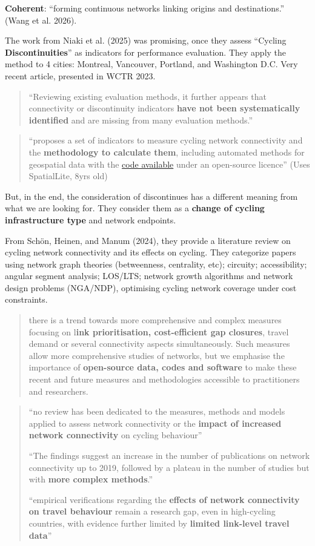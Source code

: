 \documentclass[
  sn-nature,
]{sn-jnl}
\begin{document}
\textbf{Coherent}: ``forming continuous networks linking origins and
destinations.'' (Wang et al. 2026).

The work from Niaki et al. (2025) was promising, once they assess
``Cycling \textbf{Discontinuities}'' as indicators for performance
evaluation. They apply the method to 4 cities: Montreal, Vancouver,
Portland, and Washington D.C. Very recent article, presented in WCTR
2023.

\begin{quote}
``Reviewing existing evaluation methods, it further appears that
connectivity or discontinuity indicators \textbf{have not been
systematically identified} and are missing from many evaluation
methods.''
\end{quote}

\begin{quote}
``proposes a set of indicators to measure cycling network connectivity
and the \textbf{methodology to calculate them}, including automated
methods for geospatial data with the
\href{https://github.com/nsaunier/cycling-discontinuities}{code
available} under an open-source licence'' (Uses SpatialLite, 8yrs old)
\end{quote}

But, in the end, the consideration of discontinues has a different
meaning from what we are looking for. They consider them as a
\textbf{change of cycling infrastructure type} and network endpoints.

From Schön, Heinen, and Manum (2024), they provide a literature review
on cycling network connectivity and its effects on cycling. They
categorize papers using network graph theories (betweenness, centrality,
etc); circuity; accessibility; angular segment analysis; LOS/LTS;
network growth algorithms and network design problems (NGA/NDP),
optimising cycling network coverage under cost constraints.

\begin{quote}
there is a trend towards more comprehensive and complex measures
focusing on l\textbf{ink prioritisation, cost-efficient gap closures},
travel demand or several connectivity aspects simultaneously. Such
measures allow more comprehensive studies of networks, but we emphasise
the importance of \textbf{open-source data, codes and software} to make
these recent and future measures and methodologies accessible to
practitioners and researchers.
\end{quote}

\begin{quote}
``no review has been dedicated to the measures, methods and models
applied to assess network connectivity or the \textbf{impact of
increased network connectivity} on cycling behaviour''

``The findings suggest an increase in the number of publications on
network connectivity up to 2019, followed by a plateau in the number of
studies but with \textbf{more complex methods}.''

``empirical verifications regarding the \textbf{effects of network
connectivity on travel behaviour} remain a research gap, even in
high-cycling countries, with evidence further limited by \textbf{limited
link-level travel data}''
\end{quote}
\end{document}
